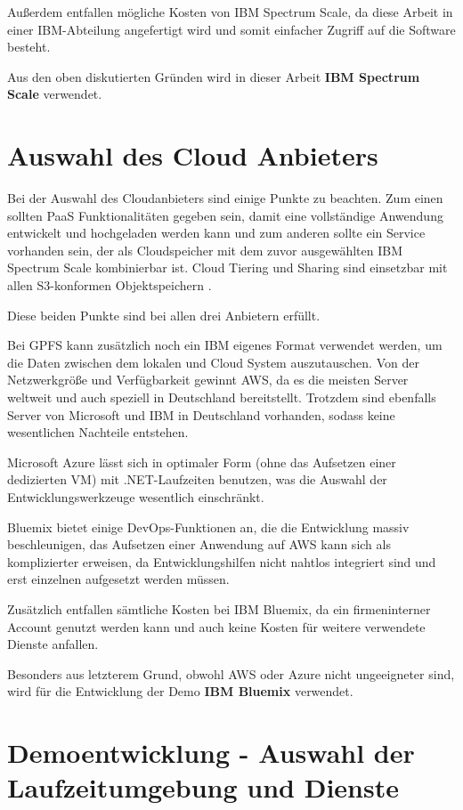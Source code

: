 Außerdem entfallen mögliche Kosten von IBM Spectrum Scale, da diese Arbeit in einer IBM-Abteilung angefertigt wird und somit einfacher Zugriff auf die Software besteht.

Aus den oben diskutierten Gründen wird in dieser Arbeit \textbf{IBM Spectrum Scale} verwendet.

\section{Auswahl des Cloud Anbieters}

Bei der Auswahl des Cloudanbieters sind einige Punkte zu beachten. Zum einen sollten \acs{PaaS} Funktionalitäten gegeben sein, damit eine vollständige Anwendung entwickelt und hochgeladen werden kann und zum anderen sollte ein Service vorhanden sein, der als Cloudspeicher mit dem zuvor ausgewählten IBM Spectrum Scale kombinierbar ist.
Cloud Tiering und Sharing sind einsetzbar mit allen S3-konformen Objektspeichern \parencite[S. 110]{ibm.2017}. 

Diese beiden Punkte sind bei allen drei Anbietern erfüllt.

Bei \acs{GPFS} kann zusätzlich noch ein IBM eigenes Format verwendet werden, um die Daten zwischen dem lokalen und Cloud System auszutauschen.
Von der Netzwerkgröße und Verfügbarkeit gewinnt \acs{AWS}, da es die meisten Server weltweit und auch speziell in Deutschland bereitstellt. Trotzdem sind ebenfalls Server von Microsoft und IBM in Deutschland vorhanden, sodass keine wesentlichen Nachteile entstehen.

Microsoft Azure lässt sich in optimaler Form (ohne das Aufsetzen einer dedizierten \acs{VM}) mit .NET-Laufzeiten benutzen, was die Auswahl der Entwicklungswerkzeuge wesentlich einschränkt.

Bluemix bietet einige DevOps-Funktionen an, die die Entwicklung massiv beschleunigen, das Aufsetzen einer Anwendung auf \acs{AWS} kann sich als komplizierter erweisen, da Entwicklungshilfen nicht nahtlos integriert sind und erst einzelnen aufgesetzt werden müssen.

Zusätzlich entfallen sämtliche Kosten bei IBM Bluemix, da ein firmeninterner Account genutzt werden kann und auch keine Kosten für weitere verwendete Dienste anfallen.

Besonders aus letzterem Grund, obwohl AWS oder Azure nicht ungeeigneter sind, wird für die Entwicklung der Demo \textbf{IBM Bluemix} verwendet.

\section{Demoentwicklung - Auswahl der Laufzeitumgebung und Dienste}

